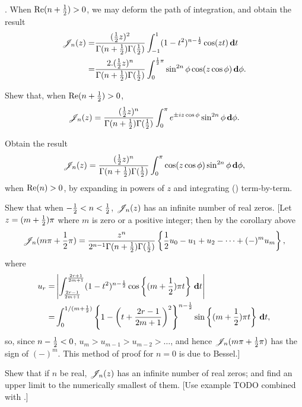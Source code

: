 \documentclass{book}
\begin{document}
\corollary. When $\mathrm{Re}(n+\frac{1}{2}) > 0$, we may deform the path of
integration, and obtain the result
\begin{align*}
  \mathscr{J}_n(z)
  =&
  \frac{ (\frac{1}{2} z)^2 }{ \Gamma(n+\frac{1}{2}) \Gamma(\frac{1}{2}) }
  \int_{-1}^1 (1-t^2)^{n-\frac{1}{2}} \cos(zt) \, \mathbf{d} t
  \\
  =&
  \frac{2 . (\frac{1}{2} z)^n }{ \Gamma(n+\frac{1}{2}) \Gamma(\frac{1}{2}) }
  \int_0^{\frac{1}{2} \pi} \sin^{2n}\phi \cos(z \cos\phi) \, \mathbf{d}\phi.
\end{align*}
\begin{wandwexample}
  Shew that, when $\mathrm{Re}(n+\frac{1}{2}) > 0$,
  $$
  \mathscr{J}_n(z)
  =
  \frac{ (\frac{1}{2} z)^n }{ \Gamma(n+\frac{1}{2}) \Gamma(\frac{1}{2}) }
  \int_0^{\pi} e^{\pm iz\cos\phi} \sin^{2n}\phi \, \mathbf{d}\phi.
  $$
\end{wandwexample}
\begin{wandwexample}
  Obtain the result
  $$
  \mathscr{J}_n(z)
  =
  \frac{ (\frac{1}{2} z)^n }{ \Gamma(n+\frac{1}{2}) \Gamma(\frac{1}{2}) }
  \int_0^{\pi} \cos(z\cos\phi) \sin^{2n}\phi \, \mathbf{d}\phi,
  $$
  when $\mathrm{Re}(n) > 0$, by expanding in powers of $z$ and
  integrating
  () term-by-term.
\end{wandwexample}
% 
% 
\begin{wandwexample}
  Shew that when $-\frac{1}{2} < n < \frac{1}{2}$, $\mathscr{J}_n(z)$ has an infinite number
  of real zeros. [Let $z = (m+\frac{1}{2})\pi$ where $m$ is zero or a
  positive integer; then by the corollary above
  $$
  \mathscr{J}_n(m\pi + \frac{1}{2}\pi)
  =
  \frac{z^n}{2^{n-1} \Gamma(n+\frac{1}{2}) \Gamma(\frac{1}{2})}
  \left\{  \frac{1}{2} u_0 - u_1 + u_2 - \cdots + (-)^m u_m \right\},
  $$
  where
  \begin{align*}
    u_r
    =&
    \left| 
      \int_{\frac{2r-1}{2m+1}}^{\frac{2r+1}{2m+1}}
      (1-t^2)^{n-\frac{1}{2}} \cos \left\{ (m+\frac{1}{2})\pi t \right\}
      \, \mathbf{d} t
     \right|
    \\
    =&
    \int_0^{1/(m+\frac{1}{2})}
    \left\{ 
      1
      -
      \left( t + \frac{2r-1}{2m+1} \right)^2
     \right\}^{n-\frac{1}{2}}
    \sin\left\{  (m+\frac{1}{2})\pi t  \right\}
    \, \mathbf{d} t,
  \end{align*}
  so, since $n - \frac{1}{2} < 0$, $u_m > u_{m-1} > u_{m-2} > \ldots$, and
  hence $\mathscr{J}_n(m\pi + \frac{1}{2}\pi)$ has the sign of $(-)^m$.
  This method of proof for $n=0$ is due to Bessel.]
\end{wandwexample}
\begin{wandwexample}
  Shew that if $n$ be real, $\mathscr{J}_n(z)$ has an infinite number of real
  zeros; and find an upper limit to the numerically smallest of them.
  [Use example TODO combined with .]
\end{wandwexample}
\end{document}

